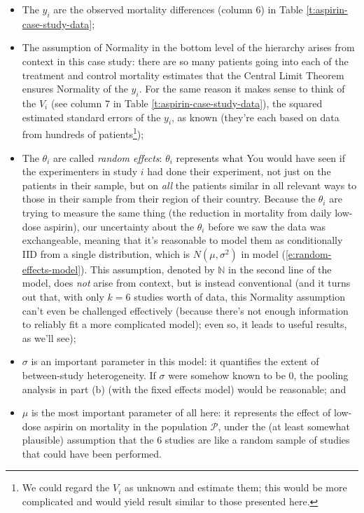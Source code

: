 \documentclass[12pt]{article}
\begin{document}
\begin{itemize}

\item

The $y_i$ are the observed mortality differences (column 6) in Table \ref{t:aspirin-case-study-data}; 

\item

The assumption of Normality in the bottom level of the hierarchy arises from context in this case study: there are so many patients going into each of the treatment and control mortality estimates that the Central Limit Theorem ensures Normality of the $y_i$. For the same reason it makes sense to think of the $V_i$ (see column 7 in Table \ref{t:aspirin-case-study-data}), the squared estimated standard errors of the $y_i$, as known (they're each based on data from hundreds of patients\footnote{We could regard the $V_i$ as unknown and estimate them; this would be more complicated and would yield result similar to those presented here.});

\item

The $\theta_i$ are called \textit{random effects}: $\theta_i$ represents what You would have seen if the experimenters in study $i$ had done their experiment, not just on the patients in their sample, but on \textit{all} the patients similar in all relevant ways to those in their sample from their region of their country. Because the $\theta_i$ are trying to measure the same thing (the reduction in mortality from daily low-dose aspirin), our uncertainty about the $\theta_i$ before we saw the data was exchangeable, meaning that it's reasonable to model them as conditionally IID from a single distribution, which is $N ( \mu, \sigma^2 )$ in model (\ref{e:random-effects-model}). This assumption, denoted by $\mathbb{ N }$ in the second line of the model, does \textit{not} arise from context, but is instead conventional (and it turns out that, with only $k = 6$ studies worth of data, this Normality assumption can't even be challenged effectively (because there's not enough information to reliably fit a more complicated model); even so, it leads to useful results, as we'll see);

\item

$\sigma$ is an important parameter in this model: it quantifies the extent of between-study heterogeneity. If $\sigma$ were somehow known to be 0, the pooling analysis in part (b) (with the fixed effects model) would be reasonable; and

\item

$\mu$ is the most important parameter of all here: it represents the effect of low-dose aspirin on mortality in the population $\mathcal{ P }$, under the (at least somewhat plausible) assumption that the 6 studies are like a random sample of studies that could have been performed.

\end{itemize}
\end{document}
